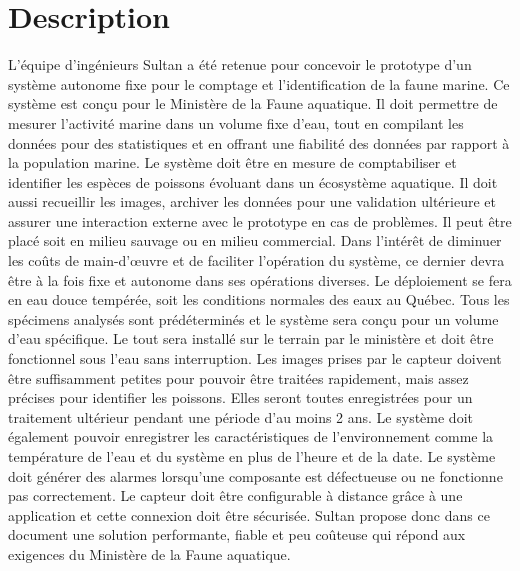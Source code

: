 
%
%


\chapter{Description}
\label{s:description}

L’équipe d’ingénieurs Sultan a été retenue pour concevoir le prototype d’un système autonome fixe pour le comptage et l’identification de la faune marine.
Ce système est conçu pour le Ministère de la Faune aquatique.
\wl
Il doit permettre de mesurer l’activité marine dans un volume fixe d’eau, tout en compilant les données pour des statistiques et en offrant une fiabilité des données par rapport à la population marine.
Le système doit être en mesure de comptabiliser et identifier les espèces de poissons évoluant dans un écosystème aquatique.
Il doit aussi recueillir les images, archiver les données pour une validation ultérieure et assurer une interaction externe avec le prototype en cas de problèmes. Il peut être placé soit en milieu sauvage ou en milieu commercial.
Dans l’intérêt de diminuer les coûts de main-d’œuvre et de faciliter l’opération du système, ce dernier devra être à la fois fixe et autonome dans ses opérations diverses.
\wl
Le déploiement se fera en eau douce tempérée, soit les conditions normales des eaux au Québec.
Tous les spécimens analysés sont prédéterminés et le système sera conçu pour un volume d’eau spécifique.
Le tout sera installé sur le terrain par le ministère et doit être fonctionnel sous l’eau sans interruption.
Les images prises par le capteur doivent être suffisamment petites pour pouvoir être traitées rapidement, mais assez précises pour identifier les poissons. 
Elles seront toutes enregistrées pour un traitement ultérieur pendant une période d’au moins 2 ans.
Le système doit également pouvoir enregistrer les caractéristiques de l’environnement comme la température de l’eau et du système en plus de l’heure et de la date.
Le système doit générer des alarmes lorsqu’une composante est défectueuse ou ne fonctionne pas correctement.
Le capteur doit être configurable à distance grâce à une application et cette connexion doit être sécurisée.
\wl
Sultan propose donc dans ce document une solution performante, fiable et peu coûteuse qui répond aux exigences du Ministère de la Faune aquatique.



